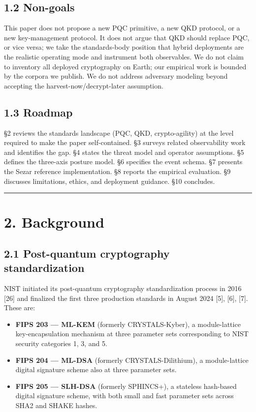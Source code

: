 \subsection{1.2 Non-goals}\label{non-goals}

This paper does not propose a new PQC primitive, a new QKD protocol, or
a new key-management protocol. It does not argue that QKD should replace
PQC, or vice versa; we take the standards-body position that hybrid
deployments are the realistic operating mode and instrument both
observables. We do not claim to inventory all deployed cryptography on
Earth; our empirical work is bounded by the corpora we publish. We do
not address adversary modeling beyond accepting the
harvest-now/decrypt-later assumption.

\subsection{1.3 Roadmap}\label{roadmap}

§2 reviews the standards landscape (PQC, QKD, crypto-agility) at the
level required to make the paper self-contained. §3 surveys related
observability work and identifies the gap. §4 states the threat model
and operator assumptions. §5 defines the three-axis posture model. §6
specifies the event schema. §7 presents the Sezar reference
implementation. §8 reports the empirical evaluation. §9 discusses
limitations, ethics, and deployment guidance. §10 concludes.

\begin{center}\rule{0.5\linewidth}{0.5pt}\end{center}

\section{2. Background}\label{background}

\subsection{2.1 Post-quantum cryptography
standardization}\label{post-quantum-cryptography-standardization}

NIST initiated its post-quantum cryptography standardization process in
2016 {[}26{]} and finalized the first three production standards in
August 2024 {[}5{]}, {[}6{]}, {[}7{]}. These are:

\begin{itemize}
\tightlist
\item
  \textbf{FIPS 203 --- ML-KEM} (formerly CRYSTALS-Kyber), a
  module-lattice key-encapsulation mechanism at three parameter sets
  corresponding to NIST security categories 1, 3, and 5.
\item
  \textbf{FIPS 204 --- ML-DSA} (formerly CRYSTALS-Dilithium), a
  module-lattice digital signature scheme also at three parameter sets.
\item
  \textbf{FIPS 205 --- SLH-DSA} (formerly SPHINCS+), a stateless
  hash-based digital signature scheme, with both small and fast
  parameter sets across SHA2 and SHAKE hashes.
\end{itemize}

